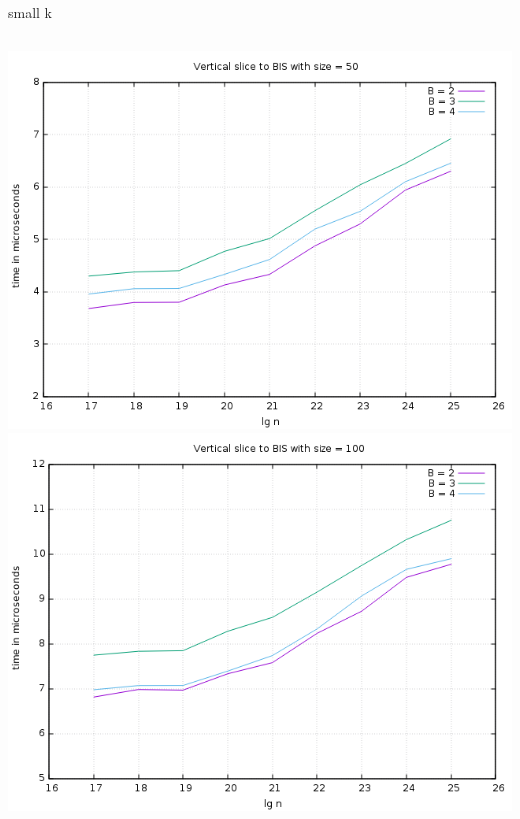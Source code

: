 \documentclass[pdf]{beamer}
\begin{document}
\begin{frame}{small k}
  \begin{columns}
    \includegraphics[scale=0.32]{pictures/analysis/comparing_BIS_50.png}
    \includegraphics[scale=0.32]{pictures/analysis/comparing_BIS_100.png}
  \end{columns}
\end{frame}
\end{document}
